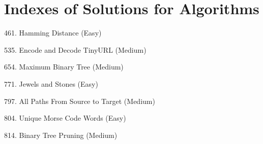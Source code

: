 \tocless\section{Indexes of Solutions for Algorithms}
\label{sec:algo_ind}

\begin{flushleft}
461. Hamming Distance (Easy)\hfill\pageref{algo:461}

535. Encode and Decode TinyURL (Medium)\hfill\pageref{algo:535}

654. Maximum Binary Tree (Medium)\hfill\pageref{algo:654}

771. Jewels and Stones (Easy)\hfill\pageref{algo:771}

797. All Paths From Source to Target (Medium)\hfill\pageref{algo:797}

804. Unique Morse Code Words (Easy)\hfill\pageref{algo:804}

814. Binary Tree Pruning (Medium)\hfill\pageref{algo:814}
\end{flushleft}

\newpage
